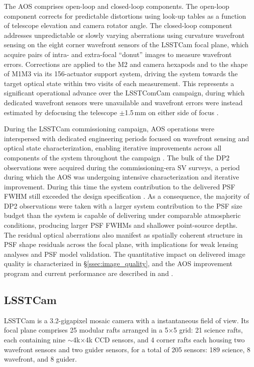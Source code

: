 The \gls{AOS} comprises open-loop and closed-loop components.
The open-loop component corrects for predictable distortions using look-up tables as a function of telescope elevation and camera rotator angle.
The closed-loop component addresses unpredictable or slowly varying aberrations using curvature wavefront sensing \citep[][]{2023aoel.confE..67T} on the eight corner wavefront sensors of the \gls{LSSTCam} focal plane, which acquire pairs of intra- and extra-focal ``donut'' images to measure wavefront errors.
Corrections are applied to the M2 and camera hexapods and to the shape of \gls{M1M3} via its 156-actuator support system, driving the system towards the target optical state within two visits of each measurement.
This represents a significant operational advance over the \gls{LSSTComCam} campaign, during which dedicated wavefront sensors were unavailable and wavefront errors were instead estimated by defocusing the telescope $\pm$1.5\,mm on either side of focus \citep[][]{10.71929/rubin/2570308}.

During the \gls{LSSTCam} commissioning campaign, \gls{AOS} operations were interspersed with dedicated engineering periods focused on wavefront sensing and optical state characterization, enabling iterative improvements across all components of the system throughout the campaign \citep[][]{SITCOMTN-170}.
The bulk of the \gls{DP2} observations were acquired during the commissioning-era \gls{SV} surveys, a period during which the \gls{AOS} was undergoing intensive characterization and iterative improvement.
During this time the system contribution to the delivered \gls{PSF} \gls{FWHM} still exceeded the design specification \citep[][]{LSE-29, RTN-122, SOTN-004}.
As a consequence, the majority of \gls{DP2} observations were taken with a larger system contribution to the \gls{PSF} size budget than the system is capable of delivering under comparable atmospheric conditions, producing larger \gls{PSF} \glspl{FWHM} and shallower point-source depths.
The residual optical aberrations also manifest as spatially coherent structure in \gls{PSF} shape residuals across the focal plane, with implications for weak lensing analyses and \gls{PSF} model validation.
The quantitative impact on delivered image quality is characterized in \S\ref{ssec:image_quality}, and the \gls{AOS} improvement program and current performance are described in \citet[][]{RTN-122} and \citet[][]{SOTN-004}.

\subsection{LSSTCam}
\label{ssec:lsstcam}
%
\gls{LSSTCam} \citep[][]{10.71929/rubin/2571927} is a 3.2-gigapixel mosaic camera with a \rubinfov instantaneous field of view.
Its focal plane comprises 25 modular rafts arranged in a 5$\xspace\times\xspace$5 grid: 21 science rafts, each containing nine $\sim$4k$\times$4k \gls{CCD} sensors, and 4 corner rafts each housing two wavefront sensors and two guider sensors, for a total of 205 sensors: 189 science, 8 wavefront, and 8 guider.


